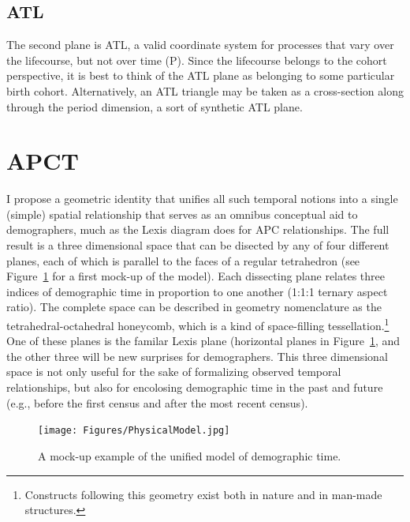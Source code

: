 \documentclass[onehalfspacing]{article}
\begin{document}
\subsection*{ATL}
The second plane is ATL, a valid coordinate system for
processes that vary over the lifecourse, but not over time (P). Since the
lifecourse belongs to the cohort perspective, it is best to think of the ATL
plane as belonging to some particular birth cohort. Alternatively, an ATL
triangle may be taken as a cross-section along through the period dimension, a
sort of synthetic ATL plane.



\section*{APCT}
I propose a geometric
identity that unifies all such temporal notions into a single (simple) spatial
relationship that serves as an omnibus conceptual aid to demographers, much as
the Lexis diagram does for APC relationships. The full result is a three
dimensional space that can be disected by any of four different planes,
each of which is parallel to the faces of a regular tetrahedron (see
Figure~\ref{fig:APCT} for a first mock-up of the model).
Each dissecting plane relates three indices of demographic time in proportion to one
another (1:1:1 ternary aspect ratio). The complete space can be described in
geometry nomenclature as the tetrahedral-octahedral honeycomb, which is a kind of space-filling tessellation.\footnote{Constructs following
this geometry exist both in nature and in man-made structures.} 
One of these planes is the familar Lexis plane (horizontal planes in
Figure~\ref{fig:APCT}, and the other three will be new surprises for
demographers. This three dimensional space is not only useful for the sake of formalizing observed temporal relationships, but also for encolosing
demographic time in the past and future (e.g., before the first census and after
the most recent census). 

\begin{figure}[!h]
\centering
\caption[cap]{A mock-up example of the unified model of demographic
time.\footnotemark}
\label{fig:APCT}
	\texttt{[image: Figures/PhysicalModel.jpg]}
\end{figure}
\end{document}
